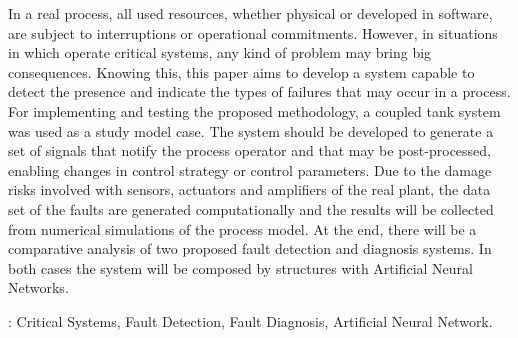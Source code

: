 In a real process, all used resources, whether physical or developed in
software, are subject to interruptions or operational commitments. However, in
situations in which operate critical systems, any kind of problem may bring big
consequences. Knowing this, this paper aims to develop a system capable to
detect the presence and indicate the types of failures that may occur in a
process. For implementing and testing the proposed methodology, a
coupled tank system was used as a study model case. The system should be
developed to generate a set of signals that notify the process operator and that
may be post-processed, enabling changes in control strategy or control
parameters. Due to the damage risks involved with sensors, actuators and
amplifiers of the real plant, the data set of the faults are generated
computationally and the results will be collected from numerical simulations of
the process model. At the end, there will be a comparative analysis of two
proposed fault detection and diagnosis systems. In both cases the system will be
composed by structures with Artificial Neural Networks.

\vspace{1.5ex}

: Critical Systems, Fault Detection, Fault Diagnosis,
Artificial Neural Network.
